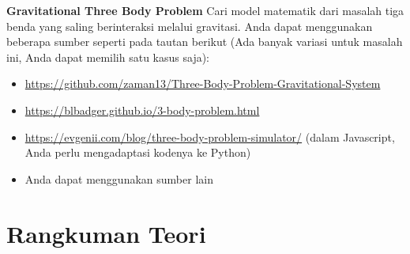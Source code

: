 \textbf{Gravitational Three Body Problem} Cari model matematik dari
masalah tiga benda yang saling berinteraksi melalui gravitasi. Anda dapat
menggunakan beberapa sumber seperti pada tautan berikut (Ada banyak variasi
untuk masalah ini, Anda dapat memilih satu kasus saja):
\begin{itemize}
\item {\footnotesize\url{https://github.com/zaman13/Three-Body-Problem-Gravitational-System}}
\item {\footnotesize\url{https://blbadger.github.io/3-body-problem.html}}
\item {\footnotesize\url{https://evgenii.com/blog/three-body-problem-simulator/}}
 (dalam Javascript, Anda perlu mengadaptasi kodenya ke Python)
 \item Anda dapat menggunakan sumber lain
\end{itemize}


\section*{Rangkuman Teori}




